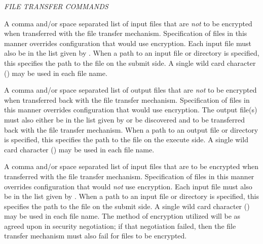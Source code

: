 \emph{FILE TRANSFER COMMANDS}
\begin{description} 


\label{man-condor-submit-dont-encrypt-input-files}
\item[dont\_encrypt\_input\_files = $<$ file1,file2,file... $>$] 
A comma and/or space separated list of input files that are \emph{not} to be
encrypted when transferred with the file transfer mechanism.
Specification of files in this manner overrides configuration that would
use encryption.
Each input file must also be in the list given by
.
When a path to an input file or directory is specified, 
this specifies the path to the file on the submit side.
A single wild card character (\Expr{*}) may be used in each file name.


\label{man-condor-submit-dont-encrypt-output-files}
\item[dont\_encrypt\_output\_files = $<$ file1,file2,file... $>$] 
A comma and/or space separated list of output files that are \emph{not} to be
encrypted when transferred back with the file transfer mechanism.
Specification of files in this manner overrides configuration that would
use encryption.
The output file(s) must also either be in the list given by
 or be discovered and to be transferred
back with the file transfer mechanism.
When a path to an output file or directory is specified, 
this specifies the path to the file on the execute side.
A single wild card character (\Expr{*}) may be used in each file name.


\label{man-condor-submit-encrypt-input-files}
\item[encrypt\_input\_files = $<$ file1,file2,file... $>$] 
A comma and/or space separated list of input files that are to be
encrypted when transferred with the file transfer mechanism.
Specification of files in this manner overrides configuration that would
\emph{not} use encryption.
Each input file must also be in the list given by
.
When a path to an input file or directory is specified, 
this specifies the path to the file on the submit side.
A single wild card character (\Expr{*}) may be used in each file name.
The method of encryption utilized will be as agreed upon in security
negotiation; if that negotiation failed, then the file transfer
mechanism must also fail for files to be encrypted.


\end{description}
